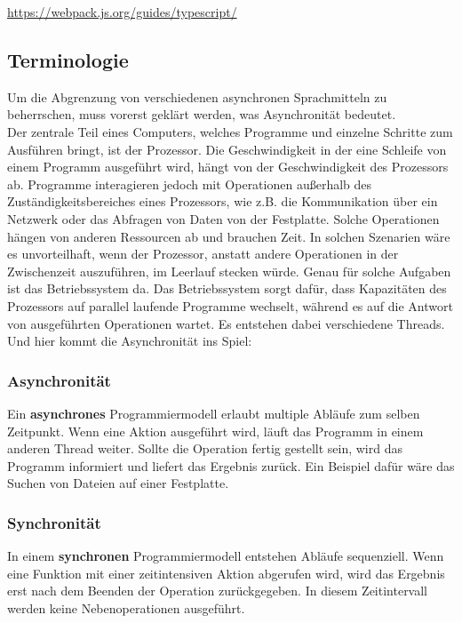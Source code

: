 \begin{center}
\url{https://webpack.js.org/guides/typescript/} 
\end{center}

\subsection{Terminologie}

Um die Abgrenzung von verschiedenen asynchronen Sprachmitteln zu beherrschen, muss vorerst geklärt werden, was Asynchronität bedeutet.\\

\noindent
Der zentrale Teil eines Computers, welches Programme und einzelne Schritte zum Ausführen bringt, ist der Prozessor. Die Geschwindigkeit in der eine Schleife von einem Programm ausgeführt wird, hängt von der Geschwindigkeit des Prozessors ab. Programme interagieren jedoch mit Operationen außerhalb des Zuständigkeitsbereiches eines Prozessors, wie z.B. die Kommunikation über ein Netzwerk oder das Abfragen von Daten von der Festplatte. Solche Operationen hängen von anderen Ressourcen ab und brauchen Zeit. In solchen Szenarien wäre es unvorteilhaft, wenn der Prozessor, anstatt andere Operationen in der Zwischenzeit auszuführen, im Leerlauf stecken würde. Genau für solche Aufgaben ist das Betriebssystem da. Das Betriebssystem sorgt dafür, dass Kapazitäten des Prozessors auf parallel laufende Programme wechselt, während es auf die Antwort von ausgeführten Operationen wartet. Es entstehen dabei verschiedene \glqq Threads\grqq{}. Und hier kommt die Asynchronität ins Spiel:

\subsubsection{Asynchronität}

Ein \textbf{asynchrones} Programmiermodell erlaubt multiple Abläufe zum selben Zeitpunkt. Wenn eine Aktion ausgeführt wird, läuft das Programm in einem anderen \glqq Thread\grqq{} weiter. Sollte die Operation fertig gestellt sein, wird das Programm informiert und liefert das Ergebnis zurück. Ein Beispiel dafür wäre das Suchen von Dateien auf einer Festplatte\cite{asynchronitaet}.

\subsubsection{Synchronität}

In einem \textbf{synchronen} Programmiermodell entstehen Abläufe sequenziell. Wenn eine Funktion mit einer zeitintensiven Aktion abgerufen wird, wird das Ergebnis erst nach dem Beenden der Operation zurückgegeben. In diesem Zeitintervall werden keine Nebenoperationen ausgeführt\cite{asynchronitaet}.\\

